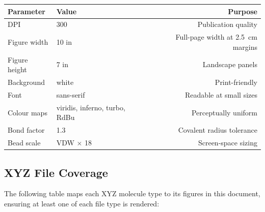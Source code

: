 \documentclass[11pt,a4paper]{article}
\begin{document}
\begin{center}
\begin{tabular}{llr}
\toprule
\textbf{Parameter} & \textbf{Value} & \textbf{Purpose} \\
\midrule
DPI           & 300    & Publication quality \\
Figure width  & 10 in  & Full-page width at 2.5~cm margins \\
Figure height & 7 in   & Landscape panels \\
Background    & white  & Print-friendly \\
Font          & sans-serif & Readable at small sizes \\
Colour maps   & viridis, inferno, turbo, RdBu & Perceptually uniform \\
Bond factor   & 1.3    & Covalent radius tolerance \\
Bead scale    & VDW $\times$ 18 & Screen-space sizing \\
\bottomrule
\end{tabular}
\end{center}

\subsection{XYZ File Coverage}

The following table maps each XYZ molecule type to its figures in this
document, ensuring at least one of each file type is rendered:
\end{document}
